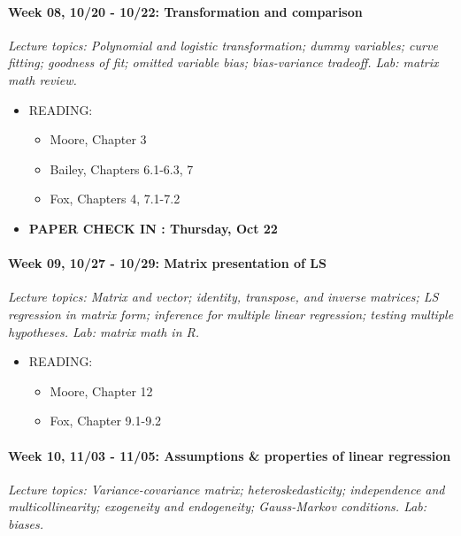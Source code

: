 \documentclass[11pt]{article}
\providecommand{\tightlist}{%
  \setlength{\itemsep}{0pt}\setlength{\parskip}{0pt}}
\begin{document}
\paragraph{Week 08, 10/20 - 10/22: Transformation and comparison\\}
\emph{Lecture topics: Polynomial and logistic transformation; dummy variables; curve fitting; goodness of fit; omitted variable bias; bias-variance tradeoff. Lab: matrix math review.}\\

\begin{itemize}
\tightlist
\item
  READING:
  \begin{itemize}
  \tightlist
  \item
    Moore, Chapter 3
  \item
    Bailey, Chapters 6.1-6.3, 7
  \item
    Fox, Chapters 4, 7.1-7.2
  \end{itemize}
      \item
  \textbf{PAPER CHECK IN : Thursday, Oct 22}
\end{itemize}

\paragraph{Week 09, 10/27 - 10/29: Matrix presentation of LS\\}
\emph{Lecture topics: Matrix and vector; identity, transpose, and inverse  matrices; LS regression in matrix form; inference for multiple linear regression; testing multiple hypotheses. Lab: matrix math in R.}\\

\begin{itemize}
\tightlist
\item
  READING:
  \begin{itemize}
  \tightlist
  \item
    Moore, Chapter 12
  \item
    Fox, Chapter 9.1-9.2
  \end{itemize}
\end{itemize}

\paragraph{Week 10, 11/03 - 11/05: Assumptions \& properties of linear
regression\\}
\emph{Lecture topics: Variance-covariance matrix; heteroskedasticity; independence and multicollinearity; exogeneity and endogeneity; Gauss-Markov conditions. Lab: biases.}\\
\end{document}
